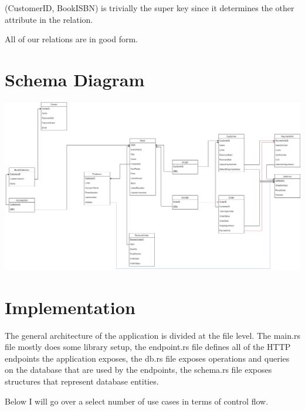 \documentclass{article}
\begin{document}
(CustomerID, BookISBN) is trivially the super key since it determines the other attribute in the relation.

All of our relations are in good form.

\section{Schema Diagram}

\begin{landscape}
\includegraphics[height=\textwidth]{schema}
\end{landscape}

\section{Implementation}
The general architecture of the application is divided at the file level. The main.rs file mostly does some library setup, the endpoint.rs file defines all of the HTTP endpoints the application exposes, the db.rs file exposes operations and queries on the database that are used by the endpoints, the schema.rs file exposes structures that represent database entities.

Below I will go over a select number of use cases in terms of control flow.
\end{document}
